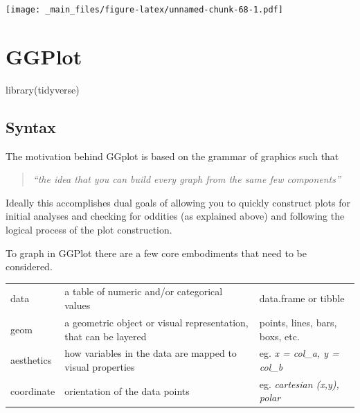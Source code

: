 \documentclass[
]{book}
\newenvironment{Shaded}{\begin{snugshade}}{\end{snugshade}}
\newcommand{\FunctionTok}[1]{\textcolor[rgb]{0.00,0.00,0.00}{#1}}
\newcommand{\NormalTok}[1]{#1}
\begin{document}
\texttt{[image: \_main\_files/figure-latex/unnamed-chunk-68-1.pdf]}

\hypertarget{ggplot}{%
\section{GGPlot}\label{ggplot}}

\begin{Shaded}
\begin{Highlighting}[]
\FunctionTok{library}\NormalTok{(tidyverse)}
\end{Highlighting}
\end{Shaded}

\hypertarget{syntax-1}{%
\subsection{Syntax}\label{syntax-1}}

The motivation behind GGplot is based on the grammar of graphics such that

\begin{quote}
\emph{``the idea that you can build every graph from the same few components''}
\end{quote}

Ideally this accomplishes dual goals of allowing you to quickly construct plots for initial analyses and checking for oddities (as explained above) and following the logical process of the plot construction.

To graph in GGPlot there are a few core embodiments that need to be considered.

\begin{longtable}[]{@{}
  >{\raggedright\arraybackslash}p{}
  >{\raggedright\arraybackslash}p{}
  >{\raggedright\arraybackslash}p{}@{}}
\toprule\noalign{}
\endhead
\bottomrule\noalign{}
\endlastfoot
data & a table of numeric and/or categorical values & data.frame or tibble \\
geom & a geometric object or visual representation, that can be layered & points, lines, bars, boxs, etc. \\
aesthetics & how variables in the data are mapped to visual properties & eg. \emph{x = col\_a, y = col\_b} \\
coordinate & orientation of the data points & eg. \emph{cartesian (x,y), polar} \\
\end{longtable}
\end{document}
